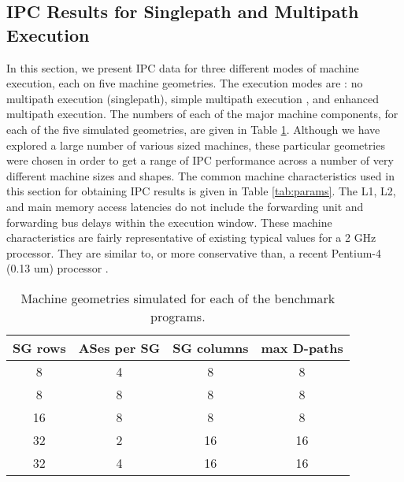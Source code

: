 \documentclass[10pt,dvips]{article}
\begin{document}
\subsection{IPC Results for Singlepath and Multipath Execution}
%
In this section, we present IPC data for three different 
modes of machine execution, each on five machine geometries.
The execution modes are : no multipath execution (singlepath),
simple multipath execution , and enhanced multipath execution.
The numbers of each of the major machine components, for each of the 
five
simulated geometries, are given in Table \ref{tab:configs}.
Although we have explored a large number of various sized
machines, these particular geometries were chosen in order
to get a range of IPC performance across a number of very
different machine sizes and shapes.
The common machine characteristics used in this section for
obtaining IPC results is given in Table \ref{tab:params}.
The L1, L2, and main memory access latencies do not include
the forwarding unit and forwarding bus delays within the
execution window.
These machine characteristics are fairly representative of
existing typical values for a 2 GHz processor.  
They are similar to, or more conservative
than, a recent Pentium-4 (0.13 um) processor \cite{Lud02}.
%
\begin{table}
\begin{center}
\caption{Machine geometries simulated for each of the benchmark
programs.}
\label{tab:configs}
\begin{tabular}{|c|c|c|c|}
\hline 
SG rows&
ASes per SG&
SG columns&
max D-paths\\
\hline
\hline 
8&4&8&8\\
\hline 
8&8&8&8\\
\hline 
16&8&8&8\\
\hline 
32&2&16&16\\
\hline 
32&4&16&16\\
\hline
\end{tabular}
\end{center}
\end{table}
%
\end{document}
